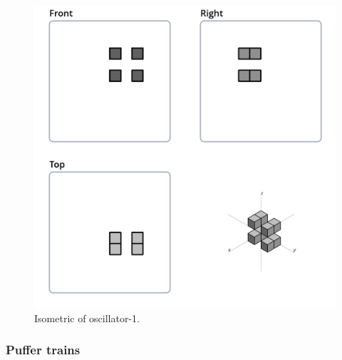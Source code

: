 \begin{figure}
	\centering
	\includegraphics[scale=0.3]{iso_settings/osc_1.png}
	\caption{Isometric of oscillator-1.}
  \label{fig:iso-osc-1}
\end{figure}

\subsubsection{Puffer trains}
